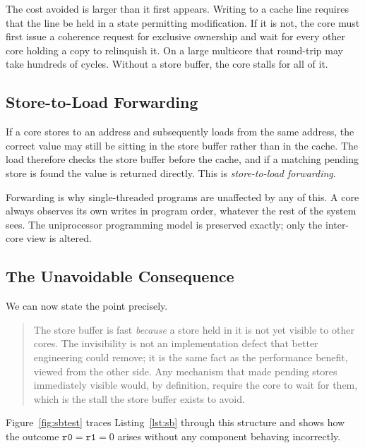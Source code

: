 The cost avoided is larger than it first appears.
Writing to a cache line
requires that the line be held in a state permitting modification.
If it is not,
the core must first issue a coherence request for exclusive ownership and wait for
every other core holding a copy to relinquish it.
On a large multicore that
round-trip may take hundreds of cycles.
Without a store buffer, the core stalls
for all of it.

\subsection{Store-to-Load Forwarding}

If a core stores to an address and subsequently loads from the same address, the
correct value may still be sitting in the store buffer rather than in the cache.
The load therefore checks the store buffer before the cache, and if a matching
pending store is found the value is returned directly.
This is
\emph{store-to-load forwarding}.

Forwarding is why single-threaded programs are unaffected by any of this.
A core
always observes its own writes in program order, whatever the rest of the system
sees.
The uniprocessor programming model is preserved exactly; only the
inter-core view is altered.

\subsection{The Unavoidable Consequence}

We can now state the point precisely.

\begin{quote}
The store buffer is fast \emph{because} a store held in it is not yet visible to
other cores.
The invisibility is not an implementation defect that better
engineering could remove; it is the same fact as the performance benefit, viewed
from the other side.
Any mechanism that made pending stores immediately visible
would, by definition, require the core to wait for them, which is the stall the
store buffer exists to avoid.
\end{quote}

\noindent Figure~\ref{fig:sbtest} traces Listing~\ref{lst:sb} through this
structure and shows how the outcome $\texttt{r0} = \texttt{r1} = 0$ arises without
any component behaving incorrectly.

